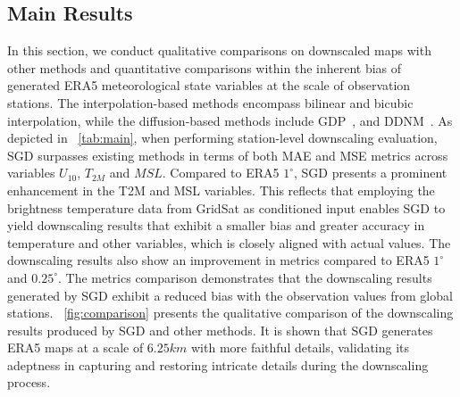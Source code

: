 \subsection{Main Results}
In this section, we conduct qualitative comparisons on downscaled maps with other methods and quantitative comparisons within the inherent bias of generated ERA5 meteorological state variables at the scale of observation stations. 
The interpolation-based methods encompass bilinear and bicubic interpolation, while the diffusion-based methods include GDP~\cite{fei2023generative}, and DDNM~\cite{wang2022zero}. 
As depicted in ~\cref{tab:main}, when performing station-level downscaling evaluation, SGD surpasses existing methods in terms of both MAE and MSE metrics across variables $U_{10}$, $T_{2M}$ and $MSL$. 
Compared to ERA5 $1^{\circ}$, SGD presents a prominent enhancement in the T2M and MSL variables.
This reflects that employing the brightness temperature data from GridSat as conditioned input enables SGD to yield downscaling results that exhibit a smaller bias and greater accuracy in temperature and other variables, which is closely aligned with actual values. 
The downscaling results also show an improvement in metrics compared to ERA5 $1^{\circ}$ and $0.25^{\circ}$. 
The metrics comparison demonstrates that the downscaling results generated by SGD exhibit a reduced bias with the observation values from global stations. 
~\cref{fig:comparison} presents the qualitative comparison of the downscaling results produced by SGD and other methods. 
It is shown that SGD generates ERA5 maps at a scale of $6.25km$ with more faithful details, validating its adeptness in capturing and restoring intricate details during the downscaling process. 

